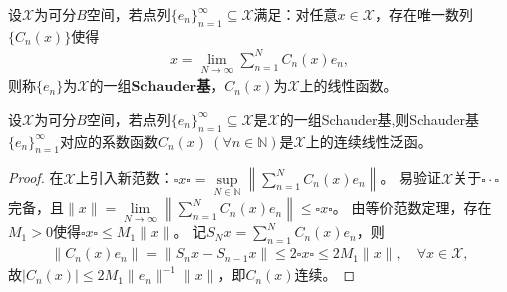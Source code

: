 \documentclass[../../main.tex]{subfiles}%
\begin{document}
\begin{definition}
设$\mathscr{X}$为可分$B$空间，若点列$\{e_n\}_{n=1}^{\infty}\subseteq\mathscr{X}$满足：对任意$x\in\mathscr{X}$，存在唯一数列$\{C_n(x)\}$使得
\begin{align*}
x=\lim\limits_{N\to\infty}\sum\limits_{n=1}^{N}C_n(x)e_n,
\end{align*}
则称$\{e_n\}$为$\mathscr{X}$的一组$\mathbf{Schauder}$\textbf{基}，$C_n(x)$为$\mathscr{X}$上的线性函数。
\end{definition}

\begin{lemma}
设$\mathscr{X}$为可分$B$空间，若点列$\{e_n\}_{n=1}^{\infty}\subseteq\mathscr{X}$是$\mathscr{X}$的一组Schauder基,则Schauder基$\{e_n\}_{n=1}^{\infty}$对应的系数函数$C_n(x)\ (\forall n\in\mathbb{N})$是$\mathscr{X}$上的连续线性泛函。
\end{lemma}

\begin{proof}
在$\mathscr{X}$上引入新范数：$\square x\square=\sup\limits_{N\in\mathbb{N}}\left\|\sum\limits_{n=1}^{N}C_n(x)e_n\right\|$。
易验证$\mathscr{X}$关于$\square\cdot\square$完备，且$\|x\|=\lim\limits_{N\to\infty}\left\|\sum\limits_{n=1}^{N}C_n(x)e_n\right\|\leqslant\square x\square$。
由等价范数定理，存在$M_1>0$使得$\square x\square\leqslant M_1\|x\|$。
记$S_Nx=\sum\limits_{n=1}^{N}C_n(x)e_n$，则
\begin{align*}
\|C_n(x)e_n\|=\|S_nx-S_{n-1}x\|\leqslant2\square x\square\leqslant2M_1\|x\|,\quad \forall x\in\mathscr{X},
\end{align*}
故$|C_n(x)|\leqslant2M_1\|e_n\|^{-1}\|x\|$，即$C_n(x)$连续。
\end{proof}
\end{document}
